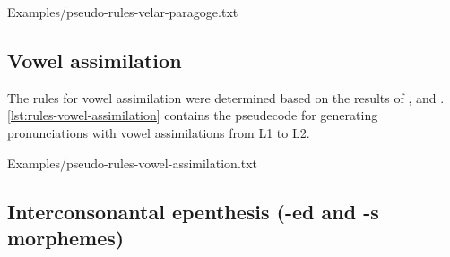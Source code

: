 %
    {Examples/pseudo-rules-velar-paragoge.txt}

\clearpage
\subsection{Vowel assimilation}

The rules for vowel assimilation were determined based on the results of
\citeauthor{Battistela2010} \citep{Battistela2010}, \citeauthor{Rauber2005} \citep{Rauber2005} and \citeauthor{Rauber2006} \citep{Rauber2006}.
\autoref{lst:rules-vowel-assimilation} contains the pseudecode for generating pronunciations with vowel assimilations from L1 to L2.

%
    {Examples/pseudo-rules-vowel-assimilation.txt}

\clearpage
\subsection{Interconsonantal epenthesis (-ed and -s morphemes)}





